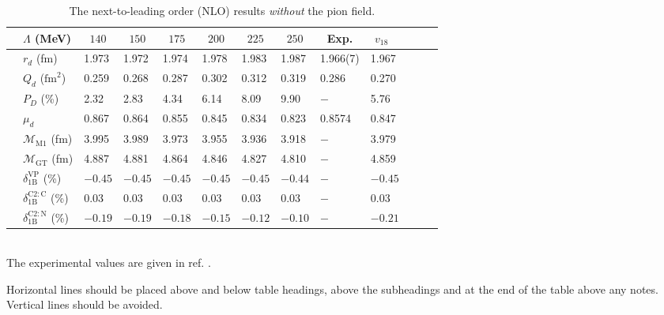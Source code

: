 \documentclass[fleqn,12pt,twoside]{article}
\begin{document}
\begin{sidewaystable}
\caption{The next-to-leading order (NLO) results
{\em without} the pion field.}
\label{table:2}
\newcommand{\m}{\hphantom{$-$}}
\newcommand{\cc}[1]{\multicolumn{1}{c}{#1}}
\renewcommand{\arraystretch}{1.2} %
\begin{tabular*}{\textheight}{@{\extracolsep{\fill}}lllllllllllll}
\hline
& $\Lambda$ (MeV) & \cc{$140$} & \cc{$150$} & \cc{$175$} & \cc{$200$} & \cc{$225$} & \cc{$250$} &
\cc{Exp.} & \cc{$v_{18}$~\cite{v18}} &  \\
\hline
 & $r_d$ (fm)                        & \m1.973 & \m1.972 & \m1.974 & \m1.978 & \m1.983 & \m1.987 & 1.966(7) & \m1.967 & \\[2pt]
 & $Q_d$ ($\mbox{fm}^2$)             & \m0.259 & \m0.268 & \m0.287 & \m0.302 & \m0.312 & \m0.319 & 0.286    & \m0.270 & \\[2pt]
 & $P_D$ (\%)                        & \m2.32  & \m2.83  & \m4.34  & \m6.14  & \m8.09  & \m9.90  & $-$      & \m5.76  & \\[2pt]
 & $\mu_d$                           & \m0.867 & \m0.864 & \m0.855 & \m0.845 & \m0.834 & \m0.823 & 0.8574   & \m0.847 & \\[5pt]
 & $\mathcal{M}_{\mathrm{M1}}$ (fm)             & \m3.995 & \m3.989 & \m3.973 & \m3.955 & \m3.936 & \m3.918 & $-$      & \m3.979 & \\[5pt]
 & $\mathcal{M}_{\mathrm{GT}}$ (fm)             & \m4.887 & \m4.881 & \m4.864 & \m4.846 & \m4.827 & \m4.810 & $-$      & \m4.859 & \\[2pt]
 & $\delta_{\mathrm{1B}}^{\mathrm{VP}}$ (\%)   & $-0.45$ & $-0.45$ & $-0.45$ & $-0.45$ & $-0.45$ & $-0.44$ & $-$      & $-0.45$ & \\[2pt]
 & $\delta_{\mathrm{1B}}^{\mathrm{C2:C}}$ (\%) & \m0.03  & \m0.03  & \m0.03  & \m0.03  & \m0.03  & \m0.03  & $-$      & \m0.03  & \\[2pt]
 & $\delta_{\mathrm{1B}}^{\mathrm{C2:N}}$ (\%) & $-0.19$ & $-0.19$ & $-0.18$ & $-0.15$ & $-0.12$ & $-0.10$ & $-$      & $-0.21$ & \\
\hline
\end{tabular*}\\[2pt]
The experimental values are given in ref. \cite{Eato75}.
\end{sidewaystable}

Horizontal lines should be placed above and below table headings, above
the subheadings and at the end of the table above any notes. Vertical
lines should be avoided.
\end{document}
